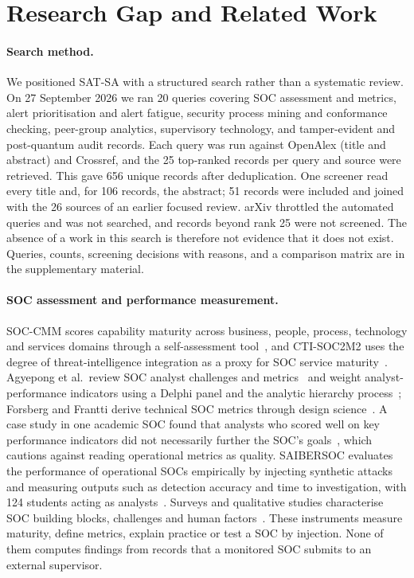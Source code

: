 \section{Research Gap and Related Work}
\label{sec:related}

\paragraph{Search method.}
We positioned SAT-SA with a structured search rather than a systematic review. On
27 September 2026 we ran 20 queries covering SOC assessment and metrics, alert
prioritisation and alert fatigue, security process mining and conformance checking,
peer-group analytics, supervisory technology, and tamper-evident and post-quantum
audit records. Each query was run against OpenAlex (title and abstract) and Crossref,
and the 25 top-ranked records per query and source were retrieved. This gave 656
unique records after deduplication. One screener read every title and, for 106
records, the abstract; 51 records were included and joined with the 26 sources of an
earlier focused review. arXiv throttled the automated queries and was not searched,
and records beyond rank 25 were not screened. The absence of a work in this search
is therefore not evidence that it does not exist. Queries, counts, screening
decisions with reasons, and a comparison matrix are in the supplementary material.

\paragraph{SOC assessment and performance measurement.}
SOC-CMM scores capability maturity across business, people, process, technology and
services domains through a self-assessment tool~\cite{vanos2016soccmm}, and
CTI-SOC2M2 uses the degree of threat-intelligence integration as a proxy for SOC
service maturity~\cite{schlette2021ctisoc2m2}. Agyepong et al.\ review SOC analyst
challenges and metrics~\cite{agyepong2019review} and weight analyst-performance
indicators using a Delphi panel and the analytic hierarchy
process~\cite{agyepong2023analyst}; Forsberg and Frantti derive technical SOC
metrics through design science~\cite{forsberg2023metrics}. A case study in one
academic SOC found that analysts who scored well on key performance indicators did
not necessarily further the SOC's goals~\cite{morin2025mismatched}, which cautions
against reading operational metrics as quality. SAIBERSOC evaluates the performance
of operational SOCs empirically by injecting synthetic attacks and measuring outputs
such as detection accuracy and time to investigation, with 124 students acting as
analysts~\cite{rosso2020saibersoc}. Surveys and qualitative studies characterise SOC
building blocks, challenges and human
factors~\cite{vielberth2020soc,kokulu2019soc,sundaramurthy2015burnout,sundaramurthy2016contradictions}.
These instruments measure maturity, define metrics, explain practice or test a SOC
by injection. None of them computes findings from records that a monitored SOC
submits to an external supervisor.

